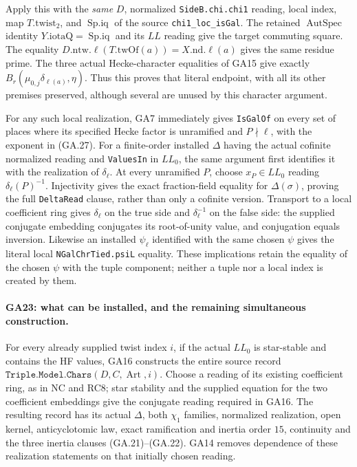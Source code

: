 Apply this with the \emph{same} $D$, normalized
\texttt{SideB.chi.chi1} reading, local index, map
$T.\mathrm{twist}_2$, and $\operatorname{Sp.iq}$ of
the source \texttt{chi1\_loc\_isGal}. The retained
$\operatorname{AutSpec}$ identity
$Y.\mathrm{iotaQ}=\operatorname{Sp.iq}$ and its $LL$
reading give the target commuting square.
The equality $D.\mathrm{ntw}.\ell(T.\mathrm{twOf}(a))
=X.\mathrm{nd}.\ell(a)$ gives the same residue prime.
The three actual Hecke-character equalities of GA15
give exactly
$B_r(\mu_{0,j}\delta_{\ell(a)},\eta)$.
Thus this proves that literal endpoint, with all its
other premises preserved, although several are unused
by this character argument.

For any such local realization, GA7 immediately gives
\texttt{IsGalOf} on every set of places where its
specified Hecke factor is unramified and $P\nmid\ell$,
with the exponent in (GA.27). For a finite-order
installed $\Delta$ having the actual cofinite normalized
reading and \texttt{ValuesIn} in $LL_0$, the same
argument first identifies it with the realization of
$\delta_\ell$. At every unramified $P$, choose
$x_P\in LL_0$ reading $\delta_\ell(P)^{-1}$.
Injectivity gives the exact fraction-field equality for
$\Delta(\sigma)$, proving the full \texttt{DeltaRead}
clause, rather than only a cofinite version.
Transport to a local coefficient ring gives $\delta_\ell$
on the true side and $\delta_\ell^{-1}$ on the false
side: the supplied conjugate embedding conjugates its
root-of-unity value, and conjugation equals inversion.
Likewise an installed $\psi_\ell$ identified with the
same chosen $\psi$ gives the literal local
\texttt{NGalChrTied.psiL} equality. These implications
retain the equality of the chosen $\psi$ with the tuple
component; neither a tuple nor a local index is created
by them.

\paragraph{GA23: what can be installed, and the remaining simultaneous construction.}
For every already supplied twist index $i$, if the actual
$LL_0$ is star-stable and contains the HF values, GA16
constructs the entire source record
$\texttt{Triple.Model.Chars}(D,C,\operatorname{Art},i)$.
Choose a reading of its existing coefficient ring, as
in NC and RC8; star stability and the supplied equation
for the two coefficient embeddings give the conjugate
reading required in GA16. The resulting record has its
actual $\Delta$, both $\chi_1$ families, normalized
realization, open kernel, anticyclotomic law, exact
ramification and inertia order $15$, continuity and
the three inertia clauses (GA.21)--(GA.22).
GA14 removes dependence of these realization statements
on that initially chosen reading.

